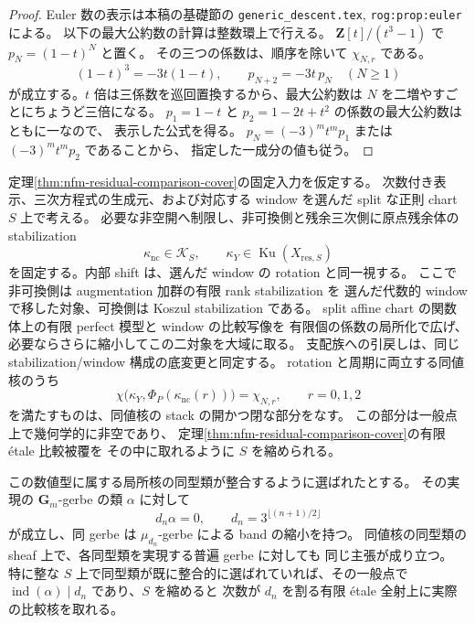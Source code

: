 \begin{proof}
Euler 数の表示は本稿の基礎節の
\texttt{generic\_descent.tex}, \texttt{rog:prop:euler}による。
以下の最大公約数の計算は整数環上で行える。
$\mathbf Z[t]/(t^3-1)$ で $p_N=(1-t)^N$ と置く。
その三つの係数は、順序を除いて $\chi_{N,r}$ である。
\[
 (1-t)^3=-3t(1-t),\qquad
 p_{N+2}=-3t\,p_N\quad(N\ge1)
\]
が成立する。$t$ 倍は三係数を巡回置換するから、最大公約数は
$N$ を二増やすごとにちょうど三倍になる。
$p_1=1-t$ と $p_2=1-2t+t^2$ の係数の最大公約数はともに一なので、
表示した公式を得る。
$p_N=(-3)^m t^m p_1$ または $(-3)^m t^m p_2$ であることから、
指定した一成分の値も従う。
\end{proof}

\begin{proposition}
\label{prop:nfm-kernel-three-primary}
定理\ref{thm:nfm-residual-comparison-cover}の固定入力を仮定する。
次数付き表示、三次方程式の生成元、および対応する window を選んだ
split な正則 chart $S$ 上で考える。
必要な非空開へ制限し、非可換側と残余三次側に原点残余体の stabilization
\[
 \kappa_{\mathrm{nc}}\in\mathcal K_S,
 \qquad \kappa_Y\in\operatorname{Ku}(X_{\mathrm{res},S})
\]
を固定する。内部 shift は、選んだ window の rotation と同一視する。
ここで非可換側は augmentation 加群の有限 rank stabilization を
選んだ代数的 window で移した対象、可換側は Koszul stabilization である。
split affine chart の関数体上の有限 perfect 模型と window の比較写像を
有限個の係数の局所化で広げ、必要ならさらに縮小してこの二対象を大域に取る。
支配族への引戻しは、同じ stabilization/window 構成の底変更と同定する。
rotation と周期に両立する同値核のうち
\begin{equation}
\label{eq:nfm-kernel-numerical-type}
 \chi\bigl(\kappa_Y,\Phi_P(\kappa_{\mathrm{nc}}(r))\bigr)
       =\chi_{N,r},\qquad r=0,1,2
\end{equation}
を満たすものは、同値核の stack の開かつ閉な部分をなす。
この部分は一般点上で幾何学的に非空であり、
定理\ref{thm:nfm-residual-comparison-cover}の有限 étale 比較被覆を
その中に取れるように $S$ を縮められる。

この数値型に属する局所核の同型類が整合するように選ばれたとする。
その実現の $\mathbf G_m$-gerbe の類 $\alpha$ に対して
\[
 d_n\alpha=0,\qquad d_n=3^{\lfloor(n+1)/2\rfloor}
\]
が成立し、同 gerbe は $\mu_{d_n}$-gerbe による band の縮小を持つ。
同値核の同型類の sheaf 上で、各同型類を実現する普遍 gerbe に対しても
同じ主張が成り立つ。
特に整な $S$ 上で同型類が既に整合的に選ばれていれば、その一般点で
$\operatorname{ind}(\alpha)\mid d_n$ であり、$S$ を縮めると
次数が $d_n$ を割る有限 étale 全射上に実際の比較核を取れる。
\end{proposition}

